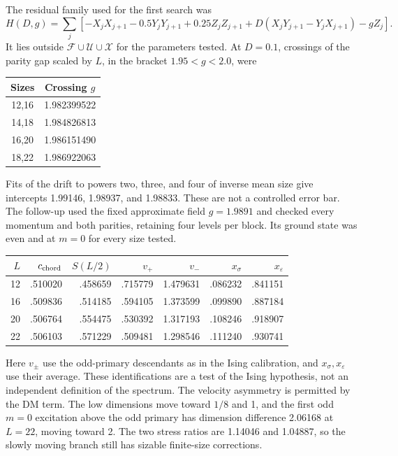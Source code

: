 \documentclass[11pt]{article}
\newcommand{\F}{\mathcal F}
\newcommand{\U}{\mathcal U}
\newcommand{\X}{\mathcal X}
\begin{document}
The residual family used for the first search was
\begin{equation}
 H(D,g)=\sum_j[-X_jX_{j+1}-0.5Y_jY_{j+1}+0.25Z_jZ_{j+1}
 +D(X_jY_{j+1}-Y_jX_{j+1})-gZ_j]. \label{eq:numeric-family}
\end{equation}
It lies outside $\F\cup\U\cup\X$ for the parameters tested. At $D=0.1$,
crossings of the parity gap scaled by $L$, in the bracket $1.95<g<2.0$, were
\begin{center}
\begin{tabular}{cc}
\toprule
Sizes & Crossing $g$\\
\midrule
12,16 & 1.982399522\\
14,18 & 1.984826813\\
16,20 & 1.986151490\\
18,22 & 1.986922063\\
\bottomrule
\end{tabular}
\end{center}
Fits of the drift to powers two, three, and four of inverse mean size give
intercepts 1.99146, 1.98937, and 1.98833. These are not a controlled error bar.
The follow-up used the fixed approximate field $g=1.9891$ and checked every
momentum and both parities, retaining four levels per block. Its ground state
was even and at $m=0$ for every size tested.

\begin{center}
\begin{tabular}{rrrrrrr}
\toprule
$L$ & $c_{\rm chord}$ & $S(L/2)$ & $v_+$ & $v_-$ & $x_\sigma$ & $x_\varepsilon$\\
\midrule
12 & .510020 & .458659 & .715779 & 1.479631 & .086232 & .841151\\
16 & .509836 & .514185 & .594105 & 1.373599 & .099890 & .887184\\
20 & .506764 & .554475 & .530392 & 1.317193 & .108246 & .918907\\
22 & .506103 & .571229 & .509481 & 1.298546 & .111240 & .930741\\
\bottomrule
\end{tabular}
\end{center}
Here $v_\pm$ use the odd-primary descendants as in the Ising calibration,
and $x_\sigma,x_\varepsilon$ use their average. These identifications are a
test of the Ising hypothesis, not an independent definition of the spectrum.
The velocity asymmetry is permitted by the DM term. The low dimensions move
toward $1/8$ and 1, and the first odd $m=0$ excitation above the odd primary
has dimension difference 2.06168 at $L=22$, moving toward 2. The two stress
ratios are 1.14046 and 1.04887, so the slowly moving branch still has sizable
finite-size corrections.
\end{document}
